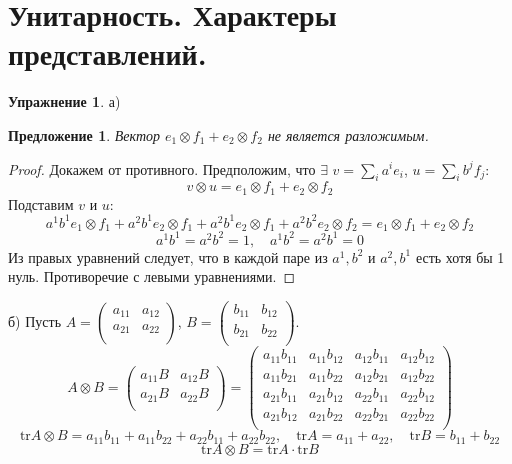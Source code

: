 \documentclass[12pt]{article}
\newtheorem{predl}[theorem]{Предложение}
\theoremstyle{definition}
\newtheorem{upr}[zad]{Упражнение}
\begin{document}
\section{Унитарность. Характеры представлений.}
\begin{upr}
\item[а)] 
\begin{predl}
    Вектор $e_1\otimes f_1+e_2\otimes f_2$ не является разложимым.
\end{predl}
\begin{proof}
    Докажем от противного. Предположим, что $\exists$ $v=\sum\limits_i a^ie_i$, $u=\sum\limits_i b^jf_j$: \begin{equation}
        v\otimes u=e_1\otimes f_1+e_2\otimes f_2
    \end{equation}
    Подставим $v$ и $u$:
    \begin{equation}
        a^1b^1e_1\otimes f_1+a^2b^1 e_2\otimes f_1+a^2b^1 e_2\otimes f_1+a^2b^2 e_2\otimes f_2=e_1\otimes f_1+e_2\otimes f_2
    \end{equation}
    \begin{equation}
        a^1b^1=a^2b^2=1, \quad a^1b^2=a^2b^1=0
    \end{equation}
    Из правых уравнений следует, что в каждой паре из $a^1, b^2$ и $a^2, b^1$ есть хотя бы 1 нуль. Противоречие с левыми уравнениями.
\end{proof}
\item[б)] Пусть $A=\left(
\begin{array}{cccc}
a_{11} & a_{12}\\
a_{21} & a_{22}\\
\end{array}
\right)$, $B=\left(
\begin{array}{cccc}
b_{11} & b_{12}\\
b_{21} & b_{22}\\
\end{array}
\right)$.
\begin{equation}
    \boxed{A\otimes B=\left(
\begin{array}{cc}
a_{11}B & a_{12}B\\
a_{21}B & a_{22}B\\
\end{array}
\right)=\left(
\begin{array}{cccc}
a_{11}b_{11} & a_{11}b_{12} & a_{12}b_{11} & a_{12}b_{12}\\
a_{11}b_{21} & a_{11}b_{22} & a_{12}b_{21} & a_{12}b_{22}\\
a_{21}b_{11} & a_{21}b_{12} & a_{22}b_{11} & a_{22}b_{12}\\
a_{21}b_{12} & a_{21}b_{22} & a_{22}b_{21} & a_{22}b_{22}\\
\end{array}
\right)}
\end{equation}
\begin{equation}
    \text{tr}A\otimes B=a_{11}b_{11}+a_{11}b_{22}+a_{22}b_{11}+a_{22}b_{22},\quad \text{tr}A=a_{11}+a_{22},\quad \text{tr}B=b_{11}+b_{22}
\end{equation}
\begin{equation}
    \boxed{\text{tr}A\otimes B=\text{tr}A\cdot \text{tr}B}
\end{equation}
\end{upr}
\end{document}
